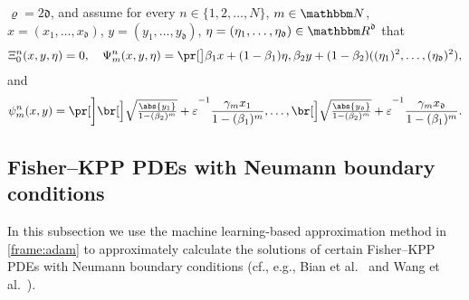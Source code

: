 \begin{algo}
			$ \varrho = 2 \mathfrak{d} $,
	and assume 
		for every
			$n \in \{1,2,\dots,N\}$,
			$m\in\N$,
			$x=(x_1, \ldots, x_{\mathfrak{d}})$, $y=(y_1, \ldots, y_{\mathfrak{d}})$, $\eta = ( \eta_1, \ldots , \eta_{\mathfrak{d}} )\in\R^{\mathfrak{d}}$
		that
		\begin{align}\label{eq:examples_setting_moment_estimation}
			\Xi^n_0(x,y,\eta) = 0,\quad 
			\Psi^n_m ( x , y , \eta )
			=
			\bpr{\beta_1 x + (1-\beta_1) \eta, \beta_2 y + (1-\beta_2) ((\eta_1)^2,\ldots,(\eta_{\mathfrak{d}})^2)},
		\end{align}
		and
		\begin{align}\label{eq:examples_setting_adam_grad_update}
			\psi^n_m ( x,y ) 
			=
			\bbbpr{
			\bbbr{
			\sqrt{\tfrac{\abs{y_1}}{1-(\beta_2)^m}} + \varepsilon
			}^{-1}
			\frac{\gamma_m x_{1}}{1-(\beta_1)^m},
			\ldots,
			\bbbr{
			\sqrt{\tfrac{\abs{y_{\mathfrak{d}}}}{1-(\beta_2)^m}} + \varepsilon
			}^{-1}
			\frac{\gamma_m x_{\mathfrak{d}}}{1-(\beta_1)^m}
			}
			.
	\end{align}
\end{algo}
%
%
%


\subsection{Fisher--KPP PDEs with Neumann boundary conditions}
\label{subsec:fisherKPP_neumann_r}
In this subsection we use the machine learning-based approximation method in \cref{frame:adam} to approximately calculate the solutions of certain Fisher--KPP PDEs with Neumann boundary conditions (cf., e.g., Bian et al.~\citep{Bian2017} and Wang et al.~\citep{Wang2021}).

